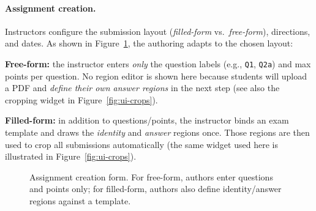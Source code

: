 \documentclass[ms,twoside,print]{nuthesis}
\begin{document}
\paragraph{Assignment creation.}
Instructors configure the submission layout (\emph{filled-form} vs.\ \emph{free-form}), directions, and dates. As shown in Figure~\ref{fig:assignment-creation}, the authoring adapts to the chosen layout: 
\begin{compactitem}
  \item \textbf{Free-form:} the instructor enters \emph{only} the question labels (e.g., \texttt{Q1}, \texttt{Q2a}) and max points per question. No region editor is shown here because students will upload a PDF and \emph{define their own answer regions} in the next step (see also the cropping widget in Figure~\ref{fig:ui-crops}).
  \item \textbf{Filled-form:} in addition to questions/points, the instructor binds an exam template and draws the \emph{identity} and \emph{answer} regions once. Those regions are then used to crop all submissions automatically (the same widget used here is illustrated in Figure~\ref{fig:ui-crops}).
\end{compactitem}

\begin{figure}[htb]
  \centering
  \caption{Assignment creation form. For free-form, authors enter questions and points only; for filled-form, authors also define identity/answer regions against a template.}
  \label{fig:assignment-creation}
\end{figure}
\end{document}
